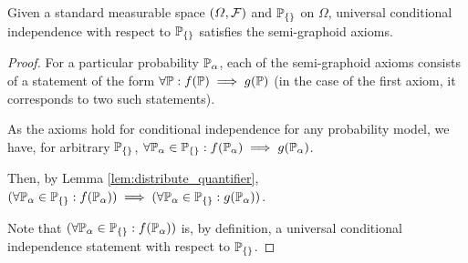 \begin{lemma}
Given a standard measurable space $(\Omega,\mathcal{F})$ and $\mathbb{P}_{\{\}}$ on $\Omega$, universal conditional independence with respect to $\mathbb{P}_{\{\}}$ satisfies the semi-graphoid axioms.
\end{lemma}

\begin{proof}
For a particular probability $\mathbb{P}_\alpha$, each of the semi-graphoid axioms consists of a statement of the form $\forall \mathbb{P}: f(\mathbb{P})\implies g(\mathbb{P})$ (in the case of the first axiom, it corresponds to two such statements).

As the axioms hold for conditional independence for any probability model, we have, for arbitrary $\mathbb{P}_{\{\}}$, $\forall \mathbb{P}_\alpha\in \mathbb{P}_{\{\}}: f(\mathbb{P}_{\alpha}) \implies g(\mathbb{P}_\alpha)$. 

Then, by Lemma \ref{lem:distribute_quantifier}, $(\forall \mathbb{P}_\alpha\in \mathbb{P}_{\{\}}: f(\mathbb{P}_{\alpha}))\implies (\forall \mathbb{P}_\alpha\in \mathbb{P}_{\{\}}: g(\mathbb{P}_{\alpha}))$.

Note that $(\forall \mathbb{P}_\alpha\in \mathbb{P}_{\{\}}: f(\mathbb{P}_{\alpha}))$ is, by definition, a universal conditional independence statement with respect to $\mathbb{P}_{\{\}}$.
\end{proof}

